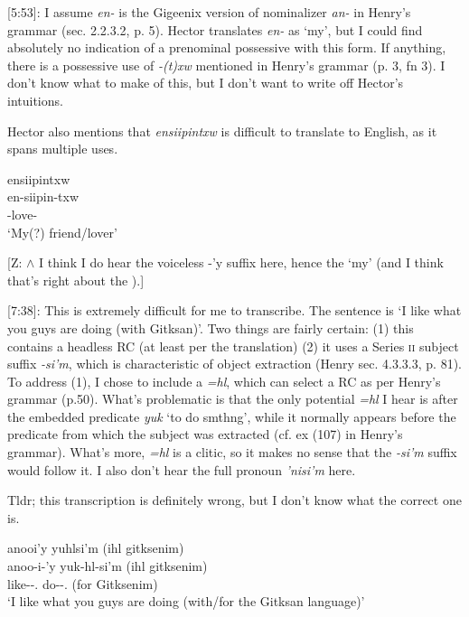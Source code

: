 \documentclass{article}
\newcommand{\tsb}{\textsubbar} %
\begin{document}
[5:53]: I assume \textit{en-} is the Gigeenix version of nominalizer \textit{an-} in Henry's grammar (sec. 2.2.3.2, p. 5). Hector translates \textit{en-} as `my', but I could find absolutely no indication of a prenominal possessive with this form. If anything, there is a possessive use of \textit{-(t)xw} mentioned in Henry's grammar (p. 3, fn 3). I don't know what to make of this, but I don't want to write off Hector's intuitions.

Hector also mentions that \textit{ensiipintxw} is difficult to translate to English, as it spans multiple uses.

\begin{exe}
    \ex \glll ensiipintxw \\
    en-siipin-txw \\
    \Nmlz{}-love-\Val{} \\
    `My(?) friend/lover'
\end{exe}

[Z: \(\wedge\) I think I do hear the voiceless -'y suffix here, hence the `my' (and I think that's right about the \Nmlz).]

[7:38]: This is extremely difficult for me to transcribe. The sentence is `I like what you guys are doing (with Gitksan)'. Two things are fairly certain: (1) this contains a headless RC (at least per the translation) (2) it uses a Series \textsc{ii} subject suffix \textit{-si'm}, which is characteristic of object extraction (Henry sec. 4.3.3.3, p. 81). To address (1), I chose to include a \textit{=hl}, which can select a RC as per Henry's grammar (p.50). What's problematic is that the only potential \textit{=hl} I hear is after the embedded predicate \textit{yuk} `to do smthng', while it normally appears before the predicate from which the subject was extracted (cf. ex (107) in Henry's grammar). What's more, \textit{=hl} is a clitic, so it makes no sense that the \textit{-si'm} suffix would follow it. I also don't hear the full pronoun \textit{'nisi'm} here. 

Tldr; this transcription is definitely wrong, but I don't know what the correct one is. 

\begin{exe}
    \ex \glll anoo\tsb{g}i'y yuhlsi'm (ihl gitksenim\tsb{x}) \\
    anoo\tsb{k}-i-'y yuk-hl-si'm (ihl gitksenim\tsb{x})\\
    like-\Tr{}-\Fsg.\Ii{} do-\Cn{}-\Spl{}.\Ii{} (for Gitksenim\tsb{x})\\
    `I like what you guys are doing (with/for the Gitksan language)'
\end{exe}
\end{document}
